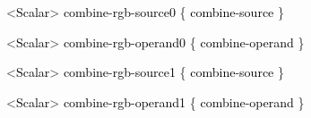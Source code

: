 \documentclass[a4paper]{article}
\newcommand\textstyleOOoComputerKeyWord[1]{\textrm{\textcolor[rgb]{0.0,0.0,0.5019608}{#1}}}
\newcommand\textstyleOOoAssemblerSpecialChar[1]{\textrm{\textcolor[rgb]{0.0,0.5019608,0.0}{#1}}}
\newcommand\textstyleOOoAssemblerIdent[1]{\textrm{\textcolor{black}{#1}}}
\begin{document}
{\color{black}
\textstyleOOoComputerKeyWord{\textcolor{black}{\ \ }}\textstyleOOoAssemblerSpecialChar{{\textless}}\textstyleOOoAssemblerIdent{Scalar}\textstyleOOoAssemblerSpecialChar{{\textgreater}}\textstyleOOoComputerKeyWord{\textcolor{black}{
}}\textstyleOOoAssemblerIdent{combine}\textstyleOOoAssemblerSpecialChar{{}-}\textstyleOOoAssemblerIdent{rgb}\textstyleOOoAssemblerSpecialChar{{}-}\textstyleOOoAssemblerIdent{source0}\textstyleOOoComputerKeyWord{\textcolor{black}{
}}\textstyleOOoAssemblerSpecialChar{\{}\textstyleOOoComputerKeyWord{\textcolor{black}{
}}\textstyleOOoAssemblerIdent{combine}\textstyleOOoAssemblerSpecialChar{{}-}\textstyleOOoAssemblerIdent{source}\textstyleOOoComputerKeyWord{\textcolor{black}{
}}\textstyleOOoAssemblerSpecialChar{\}}}

{\color{black}
\textstyleOOoComputerKeyWord{\textcolor{black}{\ \ }}\textstyleOOoAssemblerSpecialChar{{\textless}}\textstyleOOoAssemblerIdent{Scalar}\textstyleOOoAssemblerSpecialChar{{\textgreater}}\textstyleOOoComputerKeyWord{\textcolor{black}{
}}\textstyleOOoAssemblerIdent{combine}\textstyleOOoAssemblerSpecialChar{{}-}\textstyleOOoAssemblerIdent{rgb}\textstyleOOoAssemblerSpecialChar{{}-}\textstyleOOoAssemblerIdent{operand0}\textstyleOOoComputerKeyWord{\textcolor{black}{
}}\textstyleOOoAssemblerSpecialChar{\{}\textstyleOOoComputerKeyWord{\textcolor{black}{
}}\textstyleOOoAssemblerIdent{combine}\textstyleOOoAssemblerSpecialChar{{}-}\textstyleOOoAssemblerIdent{operand}\textstyleOOoComputerKeyWord{\textcolor{black}{
}}\textstyleOOoAssemblerSpecialChar{\}}}

{\color{black}
\textstyleOOoComputerKeyWord{\textcolor{black}{\ \ }}\textstyleOOoAssemblerSpecialChar{{\textless}}\textstyleOOoAssemblerIdent{Scalar}\textstyleOOoAssemblerSpecialChar{{\textgreater}}\textstyleOOoComputerKeyWord{\textcolor{black}{
}}\textstyleOOoAssemblerIdent{combine}\textstyleOOoAssemblerSpecialChar{{}-}\textstyleOOoAssemblerIdent{rgb}\textstyleOOoAssemblerSpecialChar{{}-}\textstyleOOoAssemblerIdent{source1}\textstyleOOoComputerKeyWord{\textcolor{black}{
}}\textstyleOOoAssemblerSpecialChar{\{}\textstyleOOoComputerKeyWord{\textcolor{black}{
}}\textstyleOOoAssemblerIdent{combine}\textstyleOOoAssemblerSpecialChar{{}-}\textstyleOOoAssemblerIdent{source}\textstyleOOoComputerKeyWord{\textcolor{black}{
}}\textstyleOOoAssemblerSpecialChar{\}}}

{\color{black}
\textstyleOOoComputerKeyWord{\textcolor{black}{\ \ }}\textstyleOOoAssemblerSpecialChar{{\textless}}\textstyleOOoAssemblerIdent{Scalar}\textstyleOOoAssemblerSpecialChar{{\textgreater}}\textstyleOOoComputerKeyWord{\textcolor{black}{
}}\textstyleOOoAssemblerIdent{combine}\textstyleOOoAssemblerSpecialChar{{}-}\textstyleOOoAssemblerIdent{rgb}\textstyleOOoAssemblerSpecialChar{{}-}\textstyleOOoAssemblerIdent{operand1}\textstyleOOoComputerKeyWord{\textcolor{black}{
}}\textstyleOOoAssemblerSpecialChar{\{}\textstyleOOoComputerKeyWord{\textcolor{black}{
}}\textstyleOOoAssemblerIdent{combine}\textstyleOOoAssemblerSpecialChar{{}-}\textstyleOOoAssemblerIdent{operand}\textstyleOOoComputerKeyWord{\textcolor{black}{
}}\textstyleOOoAssemblerSpecialChar{\}}}
\end{document}
